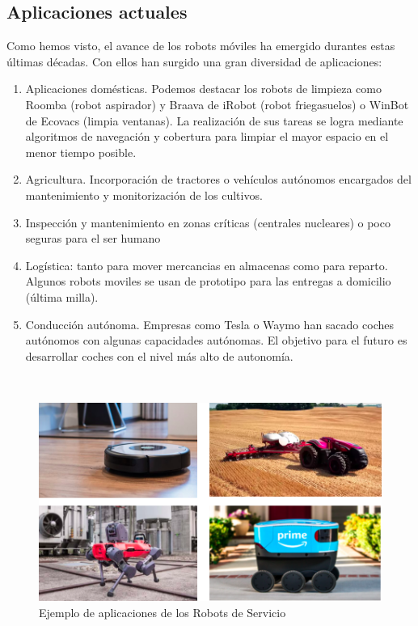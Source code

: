 \subsection{Aplicaciones actuales}
\label{subsec:aplicaciones_actuales}
Como hemos visto, el avance de los robots móviles ha emergido durantes estas últimas décadas. Con ellos han surgido una gran diversidad de aplicaciones:

\begin{enumerate}
	\item Aplicaciones domésticas. Podemos destacar los robots de limpieza como Roomba (robot aspirador) y Braava de iRobot (robot friegasuelos) o WinBot de Ecovacs (limpia ventanas). La realización de sus tareas se logra mediante algoritmos de navegación y cobertura para limpiar el mayor espacio en el menor tiempo posible.
	\item Agricultura. Incorporación de tractores o vehículos autónomos encargados del mantenimiento y monitorización de los cultivos.
	\item Inspección y mantenimiento en zonas críticas (centrales nucleares) o poco seguras para el ser humano
	\item Logística: tanto para mover mercancias en almacenas como para reparto. Algunos robots moviles se usan de prototipo para las entregas a domicilio (última milla).
	\item Conducción autónoma. Empresas como Tesla o Waymo han sacado coches autónomos con algunas capacidades autónomas. El objetivo para el futuro es desarrollar coches con el nivel más alto de autonomía.
\end{enumerate}\

\begin{figure}[H]
  \begin{center}
    \includegraphics[width=15cm]{imagenes/cap1/aplicaciones.png}
  \end{center}
  \caption[Ejemplos de aplicaciones de los Robots de Servicio]{Ejemplo de aplicaciones de los Robots de Servicio}
  \label{fig:neurona}
\end{figure}\



